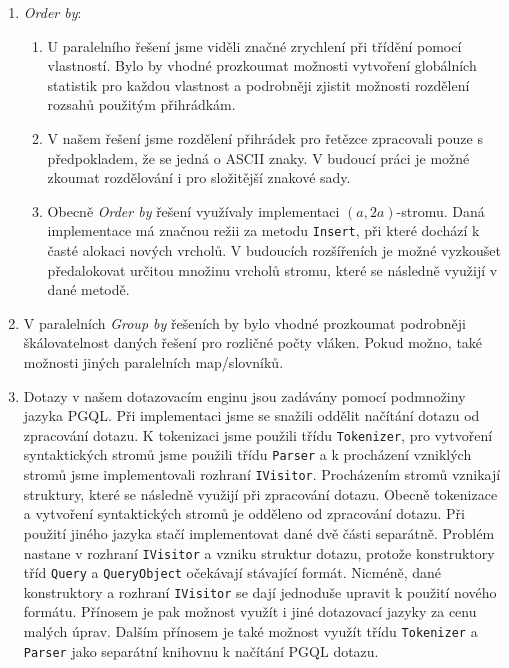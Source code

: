 \begin{enumerate}
\item \textit{Order by}:
\begin{enumerate}

\item
U paralelního řešení jsme viděli značné zrychlení při třídění pomocí vlastností.
Bylo by vhodné prozkoumat možnosti vytvoření globálních statistik pro každou vlastnost a podrobněji zjistit možnosti rozdělení rozsahů použitým přihrádkám.
\item
V našem řešení jsme rozdělení přihrádek pro řetězce zpracovali pouze s předpokladem, že se jedná o ASCII znaky.
V budoucí práci je možné zkoumat rozdělování i pro složitější znakové sady.
\item
Obecně \textit{Order by} řešení využívaly implementaci $(a, 2a)$-stromu.
Daná implementace má značnou režii za metodu \texttt{Insert}, při které dochází k časté alokaci nových vrcholů.
V budoucích rozšířeních je možné vyzkoušet předalokovat určitou množinu vrcholů stromu, které se následně využijí v dané metodě.
\end{enumerate}

\item V paralelních \textit{Group by} řešeních by bylo vhodné prozkoumat podrobněji škálovatelnost daných řešení pro rozličné počty vláken.
Pokud možno, také možnosti jiných paralelních map/slovníků.
 
\item
Dotazy v našem dotazovacím enginu jsou zadávány pomocí podmnožiny jazyka PGQL.
Při implementaci jsme se snažili oddělit načítání dotazu od zpracování dotazu.
K tokenizaci jsme použili třídu \texttt{Tokenizer}, pro vytvoření syntaktických stromů jsme použili třídu \texttt{Parser} a k procházení vzniklých stromů jsme implementovali rozhraní \texttt{IVisitor}.
Procházením stromů vznikají struktury, které se následně využijí při zpracování dotazu.
Obecně tokenizace a vytvoření syntaktických stromů je odděleno od zpracování dotazu.
Při použití jiného jazyka stačí implementovat dané dvě části separátně.
Problém nastane v rozhraní \texttt{IVisitor} a vzniku struktur dotazu, protože konstruktory tříd \texttt{Query} a \texttt{QueryObject} očekávají stávající formát.
Nicméně, dané konstruktory a rozhraní \texttt{IVisitor} se dají jednoduše upravit k použití nového formátu.
Přínosem je pak možnost využít i jiné dotazovací jazyky za cenu malých úprav.
Dalším přínosem je také možnost využít třídu \texttt{Tokenizer} a \texttt{Parser} jako separátní knihovnu k načítání PGQL dotazu.

\end{enumerate}



